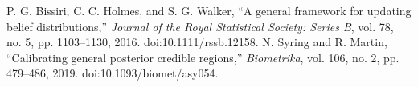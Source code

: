  P. G. Bissiri, C. C. Holmes, and S. G. Walker,
``A general framework for updating belief distributions,''
\emph{Journal of the Royal Statistical Society: Series B}, vol. 78,
no. 5, pp. 1103--1130, 2016. doi:10.1111/rssb.12158.
 N. Syring and R. Martin,
``Calibrating general posterior credible regions,''
\emph{Biometrika}, vol. 106, no. 2, pp. 479--486, 2019.
doi:10.1093/biomet/asy054.
